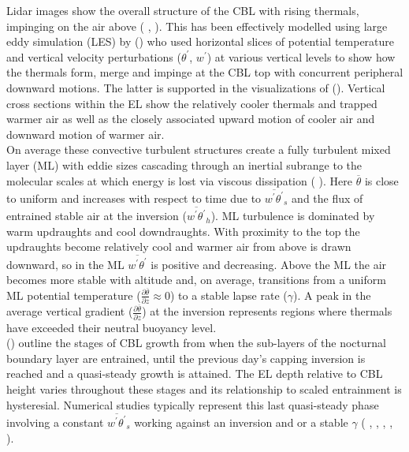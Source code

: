 Lidar images show the overall structure of the \acs{CBL} with rising thermals, impinging on the air above (\citeauthor{CrumStullEl} \citeyear{CrumStullEl}, \citeauthor{Traum11} \citeyear{Traum11}).  This has been effectively modelled using large eddy simulation (\acs{LES}) by \citeauthor{SchmidtSchu} (\citeyear{SchmidtSchu}) who used horizontal slices of potential temperature and vertical velocity perturbations ($\theta^{'}$, $w^{'}$) at various vertical levels to show how the thermals form, merge and impinge at the \acs{CBL} top with concurrent peripheral downward motions.  The latter is supported in the visualizations of \citeauthor{SullMoengStev} (\citeyear{SullMoengStev}).  Vertical cross sections within the \acs{EL} show the relatively cooler thermals and trapped warmer air as well as the closely associated upward motion of cooler air and downward motion of warmer air.\\ 

On average these convective turbulent structures create a fully turbulent mixed layer (\acs{ML}) with eddie sizes cascading through an inertial subrange to the molecular scales at which energy is lost via viscous dissipation (\citeauthor{Stull-BLMetIntro} \citeyear{Stull-BLMetIntro}).  Here $\overline{\theta}$ is close to uniform and increases with respect to time due to $\overline{w^{'}\theta^{'}}_{s}$ and the flux of entrained stable air at the inversion ($\overline{w^{'}\theta^{'}}_{h}$).  \acs{ML} turbulence is dominated by warm updraughts and cool downdraughts.  With proximity to the top the updraughts become relatively cool and warmer air from above is drawn downward, so in the \acs{ML} $\overline{w^{'}\theta^{'}}$ is positive and decreasing.  Above the \acs{ML} the air becomes more stable with altitude and, on average, transitions from a uniform \acs{ML} potential temperature ($\frac{\partial \overline{\theta}}{\partial z} \approx 0$) to a stable lapse rate ($\gamma$).  A peak in the average vertical gradient ($\frac{\partial \overline{\theta}}{\partial z}$) at the inversion represents regions where thermals have exceeded their neutral buoyancy level. \\

\citeauthor{StullNelEl} (\citeyear{StullNelEl}) outline the stages of \acs{CBL} growth from when the sub-layers of the nocturnal boundary layer are entrained, until the previous day's capping inversion is reached and a quasi-steady growth is attained.  The \acs{EL} depth relative to \acs{CBL} height varies throughout these stages and its relationship to scaled entrainment is hysteresial.  Numerical studies typically represent this last quasi-steady phase involving a constant $\overline{w^{'}\theta^{'}}_{s}$ working against an inversion and or a stable $\gamma$ (\citeauthor{SchmidtSchu} \cite{SchmidtSchu}, \citeauthor{Sorbjan} \citeyear{Sorbjan}, \citeauthor{SullMoengStev} \citeyear{SullMoengStev}, \citeauthor{FedConzMir04} \citeyear{FedConzMir04}, \citeauthor{BrooksFowler2} \citeyear{BrooksFowler2}).  

